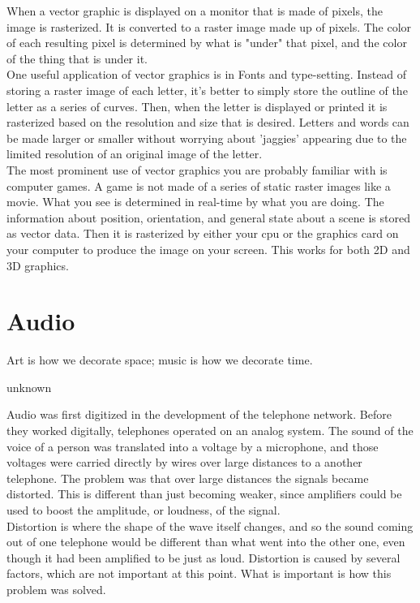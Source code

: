 When a vector graphic is displayed on a monitor that is made of pixels, the image is rasterized. It is converted to a raster image made up of pixels. The color of each resulting pixel is determined by what is "under" that pixel, and the color of the thing that is under it.\\

One useful application of vector graphics is in Fonts and type-setting. Instead of storing a raster image of each letter, it's better to simply store the outline of the letter as a series of curves. Then, when the letter is displayed or printed it is rasterized based on the resolution and size that is desired. Letters and words can be made larger or smaller without worrying about 'jaggies' appearing due to the limited resolution of an original image of the letter.\\

The most prominent use of vector graphics you are probably familiar with is computer games. A game is not made of a series of static raster images like a movie. What you see is determined in real-time by what you are doing. The information about position, orientation, and general state about a scene is stored as vector data. Then it is rasterized by either your cpu or the graphics card on your computer to produce the image on your screen. This works for both 2D and 3D graphics.\\



\section{Audio}

\epigraph{Art is how we decorate space; music is how we decorate time.}{unknown}

Audio was first digitized in the development of the telephone network. Before they worked digitally, telephones operated on an analog system. The sound of the voice of a person was translated into a voltage by a microphone, and those voltages were carried directly by wires over large distances to a another telephone. The problem was that over large distances the signals became distorted. This is different than just becoming weaker, since amplifiers could be used to boost the amplitude, or loudness, of the signal.\\

Distortion is where the shape of the wave itself changes, and so the sound coming out of one telephone would be different than what went into the other one, even though it had been amplified to be just as loud. Distortion is caused by several factors, which are not important at this point. What is important is how this problem was solved.\\

